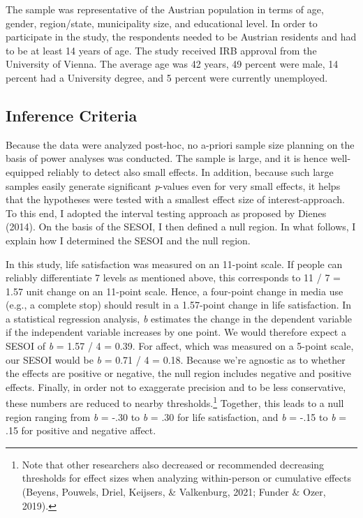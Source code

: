 \documentclass[
  english,
  man,floatsintext]{apa6}
\begin{document}
The sample was representative of the Austrian population in terms of age, gender, region/state, municipality size, and educational level.
In order to participate in the study, the respondents needed to be Austrian residents and had to be at least 14 years of age.
The study received IRB approval from the University of Vienna.
The average age was 42 years, 49 percent were male, 14 percent had a University degree, and 5 percent were currently unemployed.

\hypertarget{inference-criteria}{%
\subsection{Inference Criteria}\label{inference-criteria}}

Because the data were analyzed post-hoc, no a-priori sample size planning on the basis of power analyses was conducted.
The sample is large, and it is hence well-equipped reliably to detect also small effects.
In addition, because such large samples easily generate significant \emph{p}-values even for very small effects, it helps that the hypotheses were tested with a smallest effect size of interest-approach.
To this end, I adopted the interval testing approach as proposed by Dienes (2014).
On the basis of the SESOI, I then defined a null region.
In what follows, I explain how I determined the SESOI and the null region.

In this study, life satisfaction was measured on an 11-point scale.
If people can reliably differentiate 7 levels as mentioned above, this corresponds to 11 / 7 = 1.57 unit change on an 11-point scale.
Hence, a four-point change in media use (e.g., a complete stop) should result in a 1.57-point change in life satisfaction.
In a statistical regression analysis, \emph{b} estimates the change in the dependent variable if the independent variable increases by one point.
We would therefore expect a SESOI of \emph{b} = 1.57 / 4 = 0.39.
For affect, which was measured on a 5-point scale, our SESOI would be \emph{b} = 0.71 / 4 = 0.18.
Because we're agnostic as to whether the effects are positive or negative, the null region includes negative and positive effects.
Finally, in order not to exaggerate precision and to be less conservative, these numbers are reduced to nearby thresholds.\footnote{Note that other researchers also decreased or recommended decreasing thresholds for effect sizes when analyzing within-person or cumulative effects (Beyens, Pouwels, Driel, Keijsers, \& Valkenburg, 2021; Funder \& Ozer, 2019).}
Together, this leads to a null region ranging from \emph{b} = -.30 to \emph{b} = .30 for life satisfaction, and \emph{b} = -.15 to \emph{b} = .15 for positive and negative affect.
\end{document}
